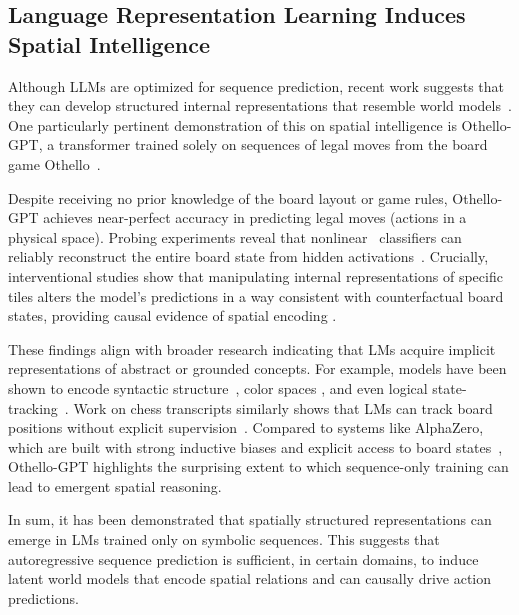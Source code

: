 \subsection{Language Representation Learning Induces Spatial Intelligence}
\label{subsec:p-2-sec-4-language-representation-learning-induces-spatial-intelligence}

Although LLMs are optimized for sequence prediction, recent work suggests that they can develop structured internal representations that resemble world models~\cite{li2021implicit,patel2022mapping,abdou2021can}. 
One particularly pertinent demonstration of this on spatial intelligence is Othello-GPT, a transformer trained solely on sequences of legal moves from the board game Othello~\cite{li2023emergent}.

Despite receiving no prior knowledge of the board layout or game rules, Othello-GPT achieves near-perfect accuracy in predicting legal moves (actions in a physical space). 
Probing experiments reveal that nonlinear~\cite{alain2016understanding,tenney2019bert,belinkov2016probing} classifiers can reliably reconstruct the entire board state from hidden activations~\cite{li2023emergent}. 
Crucially, interventional studies show that manipulating internal representations of specific tiles alters the model’s predictions in a way consistent with counterfactual board states, providing causal evidence of spatial encoding \cite{li2023emergent}.

These findings align with broader research indicating that LMs acquire implicit representations of abstract or grounded concepts. 
For example, models have been shown to encode syntactic structure~\cite{hewitt2019structural}, color spaces \cite{abdou2021can}, and even logical state-tracking~\cite{li2021implicit}. 
Work on chess transcripts similarly shows that LMs can track board positions without explicit supervision~\cite{toshniwal2021learning}. 
Compared to systems like AlphaZero, which are built with strong inductive biases and explicit access to board states~\cite{silver2018general,mcgrath2021acquisition}, Othello-GPT highlights the surprising extent to which sequence-only training can lead to emergent spatial reasoning.

In sum, it has been demonstrated that spatially structured representations can emerge in LMs trained only on symbolic sequences. 
This suggests that autoregressive sequence prediction is sufficient, in certain domains, to induce latent world models that encode spatial relations and can causally drive action predictions.








